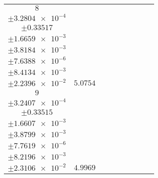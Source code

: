 \documentclass[8pt]{article}
\begin{document}
\begin{longtable}[l]{c c c c c c c c c}
$\num{8}$ & \begin{tabular}[c]{@{}c@{}}$\num{6.4412e-2}$ \\ $\pm\num{3.2804e-4}$\end{tabular} & \begin{tabular}[c]{@{}c@{}}$\num{-0.41957}$ \\ $\pm\num{0.33517}$\end{tabular} & \begin{tabular}[c]{@{}c@{}}$\num{-3.1517}$ \\ $\pm\num{1.6659e-3}$\end{tabular} & \begin{tabular}[c]{@{}c@{}}$\num{3.5798e+3}$ \\ $\pm\num{3.8184e-3}$\end{tabular} & \begin{tabular}[c]{@{}c@{}}$\num{7.1616}$ \\ $\pm\num{7.6388e-6}$\end{tabular} & \begin{tabular}[c]{@{}c@{}}$\num{1.6509}$ \\ $\pm\num{8.4134e-3}$\end{tabular} & \begin{tabular}[c]{@{}c@{}}$\num{4.454}$ \\ $\pm\num{2.2396e-2}$\end{tabular} & $\num{5.0754}$\\
$\num{9}$ & \begin{tabular}[c]{@{}c@{}}$\num{6.3166e-2}$ \\ $\pm\num{3.2407e-4}$\end{tabular} & \begin{tabular}[c]{@{}c@{}}$\num{0.39824}$ \\ $\pm\num{0.33515}$\end{tabular} & \begin{tabular}[c]{@{}c@{}}$\num{3.1513}$ \\ $\pm\num{1.6607e-3}$\end{tabular} & \begin{tabular}[c]{@{}c@{}}$\num{3.5861e+3}$ \\ $\pm\num{3.8799e-3}$\end{tabular} & \begin{tabular}[c]{@{}c@{}}$\num{7.1742}$ \\ $\pm\num{7.7619e-6}$\end{tabular} & \begin{tabular}[c]{@{}c@{}}$\num{1.6101}$ \\ $\pm\num{8.2196e-3}$\end{tabular} & \begin{tabular}[c]{@{}c@{}}$\num{4.5158}$ \\ $\pm\num{2.3106e-2}$\end{tabular} & $\num{4.9969}$\\

\end{longtable}
\end{document}
